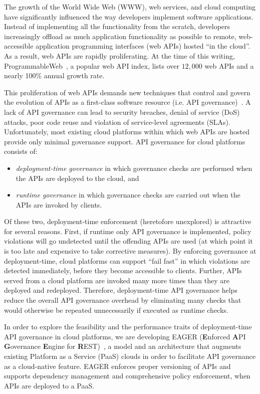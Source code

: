 The growth of the World Wide Web (WWW), web services, and cloud computing have
significantly influenced the way developers implement software applications.
Instead of implementing all the functionality from the scratch, developers
increasingly offload as much application functionality as possible to remote,
web-accessible application programming interfaces (web APIs) hosted ``in the
cloud''. As a result, web APIs are rapidly proliferating.
At the time of this writing, 
ProgrammableWeb~\cite{pweb}, a popular web API index, lists over $12,000$
web APIs and a nearly 100\% annual growth rate. 

This proliferation of web APIs demands new techniques that
control and govern the evolution of APIs as a first-class software
resource (i.e. API governance)~\cite{6903538}. A lack of API governance can lead to 
security breaches, denial of service (DoS)
attacks, poor code reuse and violation of service-level agreements (SLAs). 
Unfortunately, most existing cloud platforms
within which web APIs are hosted provide only minimal governance support.
API governance for cloud platforms consists of:
\begin{itemize}
\item \textit{deployment-time governance} in which governance checks are performed 
when the APIs are deployed to the cloud, and
\item \textit{runtime governance} in which governance checks are carried out when the APIs
are invoked by clients.
\end{itemize}
Of these two, 
deployment-time enforcement (heretofore unexplored) is attractive for several
reasons.  First, if runtime only API governance is implemented, 
policy violations will go undetected until the offending APIs are used (at which
point it is too late and expensive to take corrective measures).  
By enforcing governance at deployment-time,
cloud platforms can support ``fail fast'' in which violations are detected
immediately, before they become accessible to clients. Further, APIs served from a cloud
platform are invoked many more times than they are deployed and redeployed. 
Therefore, deployment-time API governance helps reduce the overall API governance
overhead by eliminating many checks that would otherwise be repeated unnecessarily
if executed as runtime checks.

In order to explore the feasibility and the performance traits of deployment-time
API governance in cloud platforms,
we are developing EAGER ({\bf E}nforced {\bf A}PI {\bf G}overnance
{\bf E}ngine for {\bf R}EST)~\cite{6903538}, a model and an architecture that augments existing
Platform as a Service (PaaS) clouds in order to facilitate API governance as a 
cloud-native feature. EAGER enforces proper versioning of APIs and supports dependency 
management and comprehensive policy enforcement, when APIs are deployed to a PaaS.

